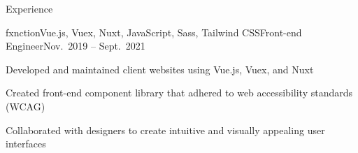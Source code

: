 \documentclass{resume} %
\begin{document}
\begin{rSection}{Experience}

\begin{rSubsection}{fxnction}{Vue.js, Vuex, Nuxt, JavaScript, Sass, Tailwind CSS}{Front-end Engineer}{Nov.\ 2019 – Sept.\ 2021}
\item Developed and maintained client websites using Vue.js, Vuex, and Nuxt
\item Created front-end component library that adhered to web accessibility standards (WCAG)
\item Collaborated with designers to create intuitive and visually appealing user interfaces
 \end{rSubsection}









\end{rSection}
\end{document}
